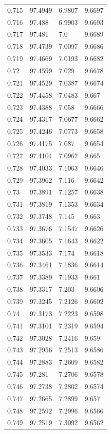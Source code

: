 \begin{tabular}{llll}
0.715 & 97.4949 & 6.9807 & 9.6697 \\
0.716 & 97.488 & 6.9903 & 9.6693 \\
0.717 & 97.481 & 7.0 & 9.6689 \\
0.718 & 97.4739 & 7.0097 & 9.6686 \\
0.719 & 97.4669 & 7.0193 & 9.6682 \\
0.72 & 97.4599 & 7.029 & 9.6678 \\
0.721 & 97.4529 & 7.0387 & 9.6674 \\
0.722 & 97.4458 & 7.0483 & 9.667 \\
0.723 & 97.4388 & 7.058 & 9.6666 \\
0.724 & 97.4317 & 7.0677 & 9.6662 \\
0.725 & 97.4246 & 7.0773 & 9.6658 \\
0.726 & 97.4175 & 7.087 & 9.6654 \\
0.727 & 97.4104 & 7.0967 & 9.665 \\
0.728 & 97.4033 & 7.1063 & 9.6646 \\
0.729 & 97.3962 & 7.116 & 9.6642 \\
0.73 & 97.3891 & 7.1257 & 9.6638 \\
0.731 & 97.3819 & 7.1353 & 9.6634 \\
0.732 & 97.3748 & 7.145 & 9.663 \\
0.733 & 97.3676 & 7.1547 & 9.6626 \\
0.734 & 97.3605 & 7.1643 & 9.6622 \\
0.735 & 97.3533 & 7.174 & 9.6618 \\
0.736 & 97.3461 & 7.1836 & 9.6614 \\
0.737 & 97.3389 & 7.1933 & 9.661 \\
0.738 & 97.3317 & 7.203 & 9.6606 \\
0.739 & 97.3245 & 7.2126 & 9.6602 \\
0.74 & 97.3173 & 7.2223 & 9.6598 \\
0.741 & 97.3101 & 7.2319 & 9.6594 \\
0.742 & 97.3028 & 7.2416 & 9.659 \\
0.743 & 97.2956 & 7.2513 & 9.6586 \\
0.744 & 97.2883 & 7.2609 & 9.6582 \\
0.745 & 97.281 & 7.2706 & 9.6578 \\
0.746 & 97.2738 & 7.2802 & 9.6574 \\
0.747 & 97.2665 & 7.2899 & 9.657 \\
0.748 & 97.2592 & 7.2996 & 9.6566 \\
0.749 & 97.2519 & 7.3092 & 9.6562 \\

\end{tabular}
